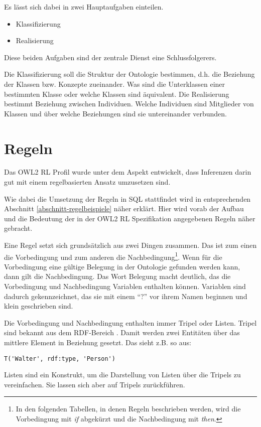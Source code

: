 Es lässt sich dabei in zwei Hauptaufgaben einteilen.
\begin{itemize}
  \item Klassifizierung
  \item Realisierung
\end{itemize}
Diese beiden Aufgaben sind der zentrale Dienst eine Schlussfolgerers. 

Die Klassifizierung soll die Struktur der Ontologie bestimmen, d.h. die Beziehung der Klassen bzw. Konzepte zueinander. Was sind die Unterklassen einer bestimmten Klasse oder welche Klassen sind äquivalent.
Die Realisierung bestimmt Beziehung zwischen Individuen. Welche Individuen sind Mitglieder von Klassen und über welche Beziehungen sind sie untereinander verbunden.

\section{Regeln}
Das OWL2 RL Profil wurde unter dem Aspekt entwickelt, dass Inferenzen darin gut mit einem regelbasierten Ansatz umzusetzen sind.

Wie dabei die Umsetzung der Regeln in SQL stattfindet wird in entsprechenden Abschnitt \ref{abschnitt-regelbeispiele} näher erklärt. Hier wird vorab der Aufbau und die Bedeutung der in der OWL2 RL Spezifikation angegebenen Regeln näher gebracht.

Eine Regel setzt sich grundsätzlich aus zwei Dingen zusammen. Das ist zum einen die Vorbedingung und zum anderen die Nachbedingung\footnote{In den folgenden Tabellen, in denen Regeln beschrieben werden, wird die Vorbedingung mit \emph{if} abgekürzt und die Nachbedingung mit \emph{then}.}. Wenn für die Vorbedingung eine gültige Belegung in der Ontologie gefunden werden kann, dann gilt die Nachbedingung. Das Wort Belegung macht deutlich, das die Vorbedingung und Nachbedingung Variablen enthalten können. Variablen sind dadurch gekennzeichnet, das sie mit einem ``?'' vor ihrem Namen beginnen und klein geschrieben sind.

Die Vorbedingung und Nachbedingung enthalten immer Tripel oder Listen. Tripel sind bekannt aus dem RDF-Bereich \cite{RDF2004}. Damit werden zwei Entitäten über das mittlere Element in Beziehung gesetzt. Das sieht z.B. so aus:
\begin{verbatim}
T('Walter', rdf:type, 'Person')
\end{verbatim}
Listen sind ein Konstrukt, um die Darstellung von Listen über die Tripels zu vereinfachen. Sie lassen sich aber auf Tripels zurückführen.

